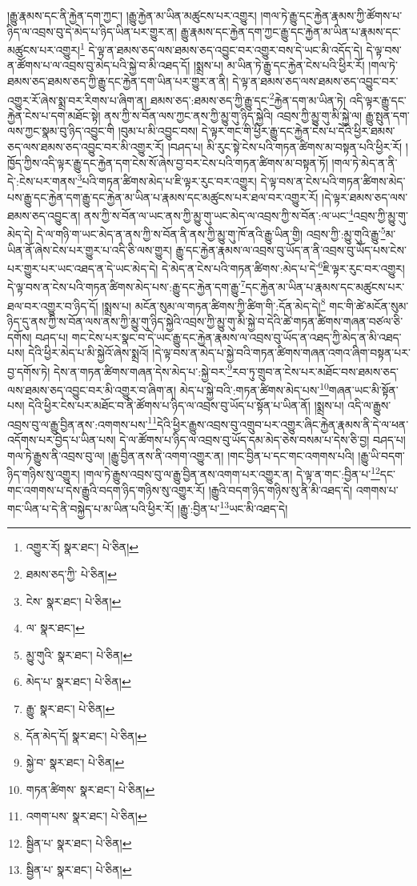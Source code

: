 །རྒྱུ་རྣམས་དང་ནི་རྐྱེན་དག་ཀྱང་། །རྒྱུ་རྐྱེན་མ་ཡིན་མཚུངས་པར་འགྱུར། །གལ་ཏེ་རྒྱུ་དང་རྐྱེན་རྣམས་ཀྱི་ཚོགས་པ་ཉིད་ལ་འབྲས་བུ་དེ་མེད་པ་ཉིད་ཡིན་པར་གྱུར་ན། རྒྱུ་རྣམས་དང་རྐྱེན་དག་ཀྱང་རྒྱུ་དང་རྐྱེན་མ་ཡིན་པ་རྣམས་དང་མཚུངས་པར་འགྱུར།\footnote{འགྱུར་རོ།  སྣར་ཐང་།  པེ་ཅིན། } དེ་ལྟ་ན་ཐམས་ཅད་ལས་ཐམས་ཅད་འབྱུང་བར་འགྱུར་བས་དེ་ཡང་མི་འདོད་དེ། དེ་ལྟ་བས་ན་ཚོགས་པ་ལ་འབྲས་བུ་མེད་པའི་སྐྱེ་བ་མི་འཐད་དོ། །སྨྲས་པ། མ་ཡིན་ཏེ་རྒྱུ་དང་རྐྱེན་ངེས་པའི་ཕྱིར་རོ། །གལ་ཏེ་ཐམས་ཅད་ཐམས་ཅད་ཀྱི་རྒྱུ་དང་རྐྱེན་དག་ཡིན་པར་གྱུར་ན་ནི། དེ་ལྟ་ན་ཐམས་ཅད་ལས་ཐམས་ཅད་འབྱུང་བར་འགྱུར་རོ་ཞེས་སྨྲ་བར་རིགས་པ་ཞིག་ན། ཐམས་ཅད་:ཐམས་ཅད་ཀྱི་རྒྱུ་དང་\footnote{ཐམས་ཅད་ཀྱི་  པེ་ཅིན། }རྐྱེན་དག་མ་ཡིན་ཏེ། འདི་ལྟར་རྒྱུ་དང་རྐྱེན་ངེས་པ་དག་མཐོང་སྟེ། ནས་ཀྱི་ས་བོན་ལས་ཀྱང་ནས་ཀྱི་མྱུ་གུ་ཉིད་སྐྱེའི། འབྲས་ཀྱི་མྱུ་གུ་མི་སྐྱེ་ལ། རྒྱུ་སྤུན་དག་ལས་ཀྱང་སྣམ་བུ་ཉིད་འབྱུང་གི །བུམ་པ་མི་འབྱུང་བས། དེ་ལྟར་གང་གི་ཕྱིར་རྒྱུ་དང་རྐྱེན་ངེས་པ་དེའི་ཕྱིར་ཐམས་ཅད་ལས་ཐམས་ཅད་འབྱུང་བར་མི་འགྱུར་རོ། །བཤད་པ། མི་རུང་སྟེ་ངེས་པའི་གཏན་ཚིགས་མ་བསྟན་པའི་ཕྱིར་རོ། །ཁྱོད་ཀྱིས་འདི་ལྟར་རྒྱུ་དང་རྐྱེན་དག་ངེས་སོ་ཞེས་བྱ་བར་ངེས་པའི་གཏན་ཚིགས་མ་བསྟན་ཏོ། །གལ་ཏེ་མེད་ན་ནི་དེ་:ངེས་པར་གནས་\footnote{ངེས་  སྣར་ཐང་།  པེ་ཅིན། }པའི་གཏན་ཚིགས་མེད་པ་ཇི་ལྟར་རུང་བར་འགྱུར། དེ་ལྟ་བས་ན་ངེས་པའི་གཏན་ཚིགས་མེད་པས་རྒྱུ་དང་རྐྱེན་དག་རྒྱུ་དང་རྐྱེན་མ་ཡིན་པ་རྣམས་དང་མཚུངས་པར་ཐལ་བར་འགྱུར་རོ། །དེ་ལྟར་ཐམས་ཅད་ལས་ཐམས་ཅད་འབྱུང་ན། ནས་ཀྱི་ས་བོན་ལ་ཡང་ནས་ཀྱི་མྱུ་གུ་ཡང་མེད་ལ་འབྲས་ཀྱི་ས་བོན་:ལ་ཡང་\footnote{ལ་  སྣར་ཐང་། }འབྲས་ཀྱི་མྱུ་གུ་མེད་དེ། དེ་ལ་གཉི་ག་ཡང་མེད་ན་ནས་ཀྱི་ས་བོན་ནི་ནས་ཀྱི་མྱུ་གུ་ཁོ་ནའི་རྒྱུ་ཡིན་གྱི། འབྲས་ཀྱི་:མྱུ་གུའི་རྒྱུ་\footnote{མྱུ་གུའི་  སྣར་ཐང་།  པེ་ཅིན། }མ་ཡིན་ནོ་ཞེས་ངེས་པར་གྱུར་པ་འདི་ཅི་ལས་གྱུར། རྒྱུ་དང་རྐྱེན་རྣམས་ལ་འབྲས་བུ་ཡོད་ན་ནི་འབྲས་བུ་ཡོད་པས་ངེས་པར་གྱུར་པར་ཡང་འཐད་ན་དེ་ཡང་མེད་དེ། དེ་མེད་ན་ངེས་པའི་གཏན་ཚིགས་:མེད་པ་དེ་\footnote{མེད་པ་  སྣར་ཐང་།  པེ་ཅིན། }ཇི་ལྟར་རུང་བར་འགྱུར། དེ་ལྟ་བས་ན་ངེས་པའི་གཏན་ཚིགས་མེད་པས་:རྒྱུ་དང་རྐྱེན་དག་རྒྱུ་\footnote{རྒྱུ་  སྣར་ཐང་།  པེ་ཅིན། }དང་རྐྱེན་མ་ཡིན་པ་རྣམས་དང་མཚུངས་པར་ཐལ་བར་འགྱུར་བ་ཉིད་དོ། །སྨྲས་པ། མངོན་སུམ་ལ་གཏན་ཚིགས་ཀྱི་ཚིག་གི་:དོན་མེད་དེ།\footnote{དོན་མེད་དོ།  སྣར་ཐང་།  པེ་ཅིན། } གང་གི་ཚེ་མངོན་སུམ་ཉིད་དུ་ནས་ཀྱི་ས་བོན་ལས་ནས་ཀྱི་མྱུ་གུ་ཉིད་སྐྱེའི་འབྲས་ཀྱི་མྱུ་གུ་མི་སྐྱེ་བ་དེའི་ཚེ་གཏན་ཚིགས་གཞན་བཙལ་ཅི་དགོས། བཤད་པ། གང་ངེས་པར་སྣང་བ་དེ་ཡང་རྒྱུ་དང་རྐྱེན་རྣམས་ལ་འབྲས་བུ་ཡོད་ན་འཐད་ཀྱི་མེད་ན་མི་འཐད་པས། དེའི་ཕྱིར་མེད་པ་མི་སྐྱེའོ་ཞེས་སྨྲའོ། །དེ་ལྟ་བས་ན་མེད་པ་སྐྱེ་བའི་གཏན་ཚིགས་གཞན་འགའ་ཞིག་བསྟན་པར་བྱ་དགོས་ཏེ། དེས་ན་གཏན་ཚིགས་གཞན་དེས་མེད་པ་:སྐྱེ་བར་\footnote{སྐྱེ་བ་  སྣར་ཐང་།  པེ་ཅིན། }རབ་ཏུ་གྲུབ་ན་ངེས་པར་མཐོང་བས་ཐམས་ཅད་ལས་ཐམས་ཅད་འབྱུང་བར་མི་འགྱུར་བ་ཞིག་ན། མེད་པ་སྐྱེ་བའི་:གཏན་ཚིགས་མེད་པས་\footnote{གཏན་ཚིགས་  སྣར་ཐང་།  པེ་ཅིན། }གཞན་ཡང་མི་སྟོན་པས། དེའི་ཕྱིར་ངེས་པར་མཐོང་བ་ནི་ཚོགས་པ་ཉིད་ལ་འབྲས་བུ་ཡོད་པ་སྟོན་པ་ཡིན་ནོ། །སྨྲས་པ། འདི་ལ་རྒྱུས་འབྲས་བུ་ལ་རྒྱུ་བྱིན་ནས་:འགགས་པས་\footnote{འགག་པས་  སྣར་ཐང་།  པེ་ཅིན། }དེའི་ཕྱིར་རྒྱུས་འབྲས་བུ་འགྲུབ་པར་འགྱུར་ཞིང་རྐྱེན་རྣམས་ནི་དེ་ལ་ཕན་འདོགས་པར་བྱེད་པ་ཡིན་པས། དེ་ལ་ཚོགས་པ་ཉིད་ལ་འབྲས་བུ་ཡོད་དམ་མེད་ཅེས་བསམ་པ་དེས་ཅི་བྱ། བཤད་པ། གལ་ཏེ་རྒྱུས་ནི་འབྲས་བུ་ལ། །རྒྱུ་བྱིན་ནས་ནི་འགག་འགྱུར་ན། །གང་བྱིན་པ་དང་གང་འགགས་པའི། །རྒྱུ་ཡི་བདག་ཉིད་གཉིས་སུ་འགྱུར། །གལ་ཏེ་རྒྱུས་འབྲས་བུ་ལ་རྒྱུ་བྱིན་ནས་འགག་པར་འགྱུར་ན། དེ་ལྟ་ན་གང་:བྱིན་པ་\footnote{སྦྱིན་པ་  སྣར་ཐང་།  པེ་ཅིན། }དང་གང་འགགས་པ་དེས་རྒྱུའི་བདག་ཉིད་གཉིས་སུ་འགྱུར་རོ། །རྒྱུའི་བདག་ཉིད་གཉིས་སུ་ནི་མི་འཐད་དེ། འགགས་པ་གང་ཡིན་པ་དེ་ནི་བསྐྱེད་པ་མ་ཡིན་པའི་ཕྱིར་རོ། །རྒྱུ་:བྱིན་པ་\footnote{སྦྱིན་པ་  སྣར་ཐང་།  པེ་ཅིན། }ཡང་མི་འཐད་དེ། 